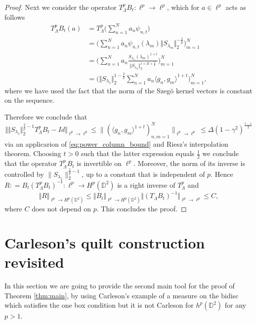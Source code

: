 \documentclass{amsart}
\numberwithin{equation}{section}
\newtheorem{rem}[thm]{Remark}
\begin{document}
\begin{proof}
Next we consider the operator $T_\Lambda^p B_t : \ell^p \to \ell^p$, which for $a\in \ell^p$ acts as follows 
\begin{align*}
	T_\Lambda^p B_t (a) & = T_\Lambda^p \Big ( \sum_{n=1}^N a_n \psi_{n,t} \Big) \\
			    & = \Big( \sum_{n=1}^N a_n \psi_{n,t}(\lambda_m) \Vert S_{\lambda_m}\Vert_2^{-\frac2p} \Big)_{m=1}^N  \\
			    & =  \Big( \sum_{n=1}^N a_n \frac{S_{\lambda_n}(\lambda_m)^{1+t}}{\Vert S_{\lambda_n}\Vert_2^{1+2t+\frac2p}}   \Big)_{m=1}^N \\
			    & =  \Big( \Vert S_{\lambda_1}\Vert_2^{1-\frac2p} \sum_{n=1}^N a_n \langle g_n, g_m \rangle^{1+t}  \Big)_{m=1}^N,
\end{align*}
where we have used the fact that the norm of the Szeg\"o kernel vectors is constant on the sequence.  

Therefore we conclude that 
\[
\Vert \Vert S_{\lambda_1}\Vert_2^{\frac2p-1} T_\Lambda^p B_t - Id \Vert_{\ell^p\to \ell^p } \leq \|(\langle g_n, g_m\rangle^{1+t})_{n, m=1}^N\|_{\ell^p\to\ell^p}\leq \Delta(1-\gamma^2)^{\frac{t-1}{2}} 
\]
via an applicarion of \eqref{eq:power_column_bound} and Riesz's interpolation theorem.
Choosing $t>0$ such that the latter expression equals $ \frac12 $ we conclude that the operator $T_\Lambda^pB_t $ is invertible on $\ell^p $. Moreover, the norm of its inverse is controlled by $\|S_{\lambda_1}\|^{\frac{2}{p}-1}_{2}$, up to a constant that is independent of $p$. Hence $R : = B_t(T_\Lambda^p B_t)^{-1} : \ell^p \to H^p(\mathbb{D}^2) $ is a right inverse of $T_\Lambda^p  $ and
\[ \Vert R \Vert_{\ell^p \to H^p(\mathbb{D}^2)} \leq \Vert B_t\Vert_{\ell^p \to H^p(\mathbb{D}^2)} \Vert (T_\Lambda B_t)^{-1}\Vert_{\ell^p\to \ell^p}\leq C, \]
where $C$ does not depend on $p$. This concludes the proof.
\end{proof}
\section{Carleson's quilt construction revisited}\label{sec:Carlesons_Quilt}

In this section we are going to provide the second main tool for the proof of Theorem \ref{thm:main}, by using Carleson's example of a measure on the bidisc which satisfies the one box condition 
but it is not Carleson for $h^p(\mathbb{D}^2) $ for any $p>1 $. 
\end{document}
